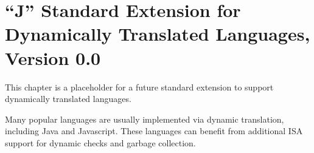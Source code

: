 \chapter{``J'' Standard Extension for Dynamically Translated Languages, Version 0.0}
\label{sec:j}

This chapter is a placeholder for a future standard extension to
support dynamically translated languages.

\begin{commentary}
  Many popular languages are usually implemented via dynamic
  translation, including Java and Javascript. These languages can
  benefit from additional ISA support for dynamic checks and garbage
  collection.
\end{commentary}


